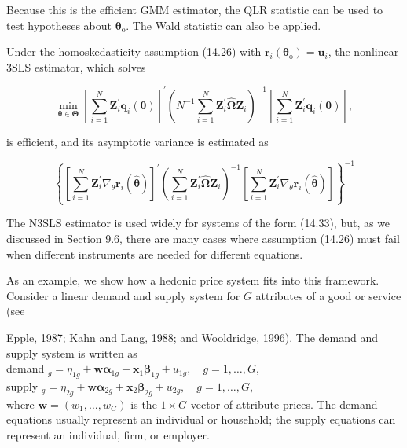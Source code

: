 \documentclass[10pt]{article}
\begin{document}
Because this is the efficient GMM estimator, the QLR statistic can be used to test hypotheses about $\boldsymbol{\theta}_{\mathrm{o}}$. The Wald statistic can also be applied.

Under the homoskedasticity assumption (14.26) with $\mathbf{r}_{i}\left(\boldsymbol{\theta}_{\mathrm{o}}\right)=\mathbf{u}_{i}$, the nonlinear 3SLS estimator, which solves

$$
\min _{\boldsymbol{\theta} \in \boldsymbol{\Theta}}\left[\sum_{i=1}^{N} \mathbf{Z}_{i}^{\prime} \mathbf{q}_{i}(\boldsymbol{\theta})\right]^{\prime}\left(N^{-1} \sum_{i=1}^{N} \mathbf{Z}_{i}^{\prime} \hat{\boldsymbol{\Omega}} \mathbf{Z}_{i}\right)^{-1}\left[\sum_{i=1}^{N} \mathbf{Z}_{i}^{\prime} \mathbf{q}_{i}(\boldsymbol{\theta})\right],
$$

is efficient, and its asymptotic variance is estimated as

$$
\left\{\left[\sum_{i=1}^{N} \mathbf{Z}_{i}^{\prime} \nabla_{\theta} \mathbf{r}_{i}(\hat{\boldsymbol{\theta}})\right]^{\prime}\left(\sum_{i=1}^{N} \mathbf{Z}_{i}^{\prime} \hat{\mathbf{\Omega}} \mathbf{Z}_{i}\right)^{-1}\left[\sum_{i=1}^{N} \mathbf{Z}_{i}^{\prime} \nabla_{\theta} \mathbf{r}_{i}(\hat{\boldsymbol{\theta}})\right]\right\}^{-1}
$$

The N3SLS estimator is used widely for systems of the form (14.33), but, as we discussed in Section 9.6, there are many cases where assumption (14.26) must fail when different instruments are needed for different equations.

As an example, we show how a hedonic price system fits into this framework. Consider a linear demand and supply system for $G$ attributes of a good or service (see

Epple, 1987; Kahn and Lang, 1988; and Wooldridge, 1996). The demand and supply system is written as\\
demand $_{g}=\eta_{1 g}+\mathbf{w} \boldsymbol{\alpha}_{1 g}+\mathbf{x}_{1} \boldsymbol{\beta}_{1 g}+u_{1 g}, \quad g=1, \ldots, G$,\\
supply $_{g}=\eta_{2 g}+\mathbf{w} \boldsymbol{\alpha}_{2 g}+\mathbf{x}_{2} \boldsymbol{\beta}_{2 g}+u_{2 g}, \quad g=1, \ldots, G$,\\
where $\mathbf{w}=\left(w_{1}, \ldots, w_{G}\right)$ is the $1 \times G$ vector of attribute prices. The demand equations usually represent an individual or household; the supply equations can represent an individual, firm, or employer.
\end{document}
